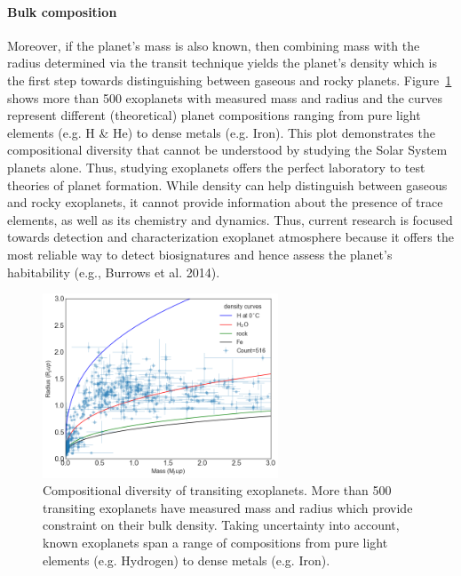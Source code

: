 \paragraph{Bulk composition}
Moreover, if the planet’s mass is also known, %
then combining mass with the radius determined via the transit technique yields the planet’s density which is the first step towards distinguishing between gaseous and rocky planets. 
Figure~\ref{fig:density} shows more than 500 exoplanets with measured mass and radius and the curves represent different (theoretical) planet  compositions ranging from pure light elements (e.g. H \& He) to dense metals (e.g. Iron). This plot demonstrates the compositional diversity that cannot be understood by studying the Solar System planets alone. Thus, studying exoplanets offers the perfect laboratory to test theories of planet formation. While density can help distinguish between gaseous and rocky exoplanets, it cannot provide information about the presence of trace elements, as well as its chemistry and dynamics. Thus, current research is focused towards detection and characterization exoplanet atmosphere because it offers the most reliable way to detect biosignatures and hence assess the planet's habitability (e.g., Burrows et al. 2014). 
\begin{figure}
\centering
\includegraphics[width=7cm]{figures/density.png}
\caption{Compositional diversity of transiting exoplanets. More than 500 transiting exoplanets have measured mass and radius which provide constraint on their bulk density. Taking uncertainty into account, known exoplanets span a range of compositions from pure light elements (e.g. Hydrogen) to dense metals (e.g. Iron).}
\label{fig:density}
\end{figure}

